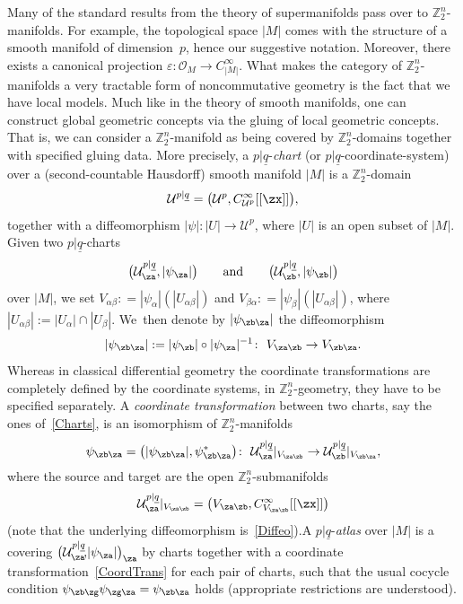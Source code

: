 \documentclass[10pt,a4paper]{amsart}
\newcommand{\Z}{{\mathbb Z}}
\def\ul{\underline}
\def\cO{\mathcal{O}}
\def\cU{\mathcal{U}}
\def\ul{\underline}
\newcommand{\0}{\otimes}
\numberwithin{equation}{section}
\begin{document}
Many of the standard results from the theory of supermanifolds pass over to $\Z_2^n$-manifolds. For example, the topological space $|M|$ comes with the structure of a smooth manifold of dimension~$p$, hence our suggestive notation. Moreover, there exists a canonical projection $\varepsilon \colon \cO_M \rightarrow C_{|M|}^{\infty}$. What makes the category of $\Z_{2}^{n}$-manifolds a very tractable form of noncommutative geometry is the fact that we have local models. Much like in the theory of smooth manifolds, one can construct global geometric concepts via the gluing of local geometric concepts. That is, we can consider a $\Z_{2}^{n}$-manifold as being covered by $\Z_2^n$-domains together with specified gluing data. More precisely, a $p|\ul q$-\emph{chart} (or $p|\ul q$-coordinate-system) over a (second-countable Hausdorff) smooth manifold $|M|$ is a $\Z_2^n$-domain
\[
\mathcal{U}^{p|\ul q}=\big(\cU^p,C^\infty_{\cU^p}[[\zx]]\big),
\]
together with a diffeomorphism $|\psi|\colon |U|\to \cU^p$, where $|U|$ is an open subset of $|M|$. Given two $p|\ul q$-charts
%
 \begin{gather}\label{Charts}
\big(\mathcal{U}^{p|\ul q}_\za,|\psi_\za|\big)\qquad\text{and}\qquad
\big(\mathcal{U}^{p|\ul q}_\zb,|\psi_\zb|\big)
 \end{gather}
 over $|M|$, we set $V_{\alpha \beta} : = |\psi_\alpha|(|U_{\alpha \beta}|)$ and $V_{ \beta \alpha} : = |\psi_\beta|(|U_{\alpha \beta}|)$, where $|U_{\alpha \beta}| := |U_{\alpha}|\cap |U_{\beta}| $. We~then denote by $|\psi_{\zb\za}|$ the diffeomorphism
 \begin{gather}\label{Diffeo}
 |\psi_{\zb\za}|:=|\psi_\zb|\circ|\psi_\za|^{-1}\colon\ V_{\za\zb} \to V_{\zb\za}.
 \end{gather}
%
Whereas in classical differential geometry the coordinate transformations are completely defined by the coordinate systems, in $\Z_2^n$-geometry, they have to be specified separately. A \emph{coordinate transformation} between two charts, say the ones of~\eqref{Charts}, is an isomorphism of $\Z_2^n$-manifolds
\begin{gather}\label{CoordTrans}
\psi_{\zb\za}=\big(|\psi_{\zb\za}|,\psi^*_{\zb\za}\big)\colon\ \mathcal{ U}^{p|\ul q}_{\za}|_{V_{\za\zb}}\to \mathcal{ U}^{p|\ul q}_{\zb}|_{V_{\zb\za}},
\end{gather}
where the source and target are the open $\Z_2^n$-submanifolds
\[
\cU^{p|\ul q}_\za|_{V_{\za\zb}}=\big(V_{\za\zb}, C^\infty_{V_{\za\zb}}[[\zx]]\big)
\]
(note that the underlying diffeomorphism is~\eqref{Diffeo}).\;A $p|\ul q$-\emph{atlas} over $|M|$ is a covering $\big(\mathcal{ U}^{p|\ul q}_\za\!,\!|\psi_\za|\big)_\za$ by charts together with a coordinate transformation~\eqref{CoordTrans} for each pair of charts, such that the usual {cocycle} condition $\psi_{\zb\zg}\psi_{\zg\za}=\psi_{\zb\za}$ holds (appropriate restrictions are understood).
\end{document}
